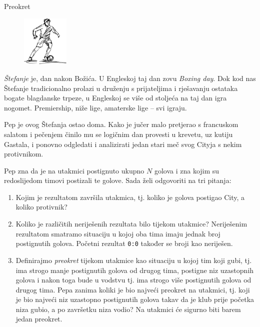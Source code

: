 \begin{statement}[
  problempoints=50,
  timelimit=1 sekunda,
  memorylimit=512 MiB,
]{Preokret}

\setlength\intextsep{-0.1cm}
\begin{figure}
\centering
\includegraphics[width=0.2\textwidth]{img/fudbaler.jpg}
\end{figure}

  \textit{Štefanje} je, dan nakon Božića. U Engleskoj taj dan zovu \textit{Boxing day}. Dok kod nas
Štefanje tradicionalno prolazi u druženju s prijateljima i rješavanju
ostataka bogate blagdanske trpeze, u Engleskoj se više od stoljeća na taj dan
igra nogomet. Premiership, niže lige, amaterske lige -- svi igraju.

Pep je ovog Štefanja ostao doma. Kako je jučer malo pretjerao s francuskom
salatom i pečenjem činilo mu se logičnim dan provesti u krevetu, uz kutiju
Gastala, i ponovno odgledati i analizirati jedan stari meč svog Cityja s
nekim protivnikom.

Pep zna da je na utakmici postignuto ukupno $N$ golova i zna kojim su
redoslijedom timovi postizali te golove. Sada želi odgovoriti na tri pitanja:

\begin{enumerate}
  \item Kojim je rezultatom završila utakmica, tj. koliko je golova postigao
        City, a koliko protivnik?
  \item Koliko je različitih neriješenih rezultata bilo tijekom utakmice?
        Neriješenim rezultatom smatramo situaciju u kojoj oba tima imaju jednak
        broj postignutih golova. Početni rezultat \texttt{0:0} također se broji
        kao neriješen.
  \item Definirajmo \textit{preokret} tijekom utakmice kao situaciju u kojoj
        tim koji gubi, tj. ima strogo manje postignutih golova od drugog tima,
        postigne niz uzastopnih golova i nakon toga bude u vodstvu tj. ima strogo
        više postignutih golova od drugog tima. Pepa zanima koliki je bio najveći
        preokret na utakmici, tj. koji je bio najveći niz uzastopno postignutih
        golova takav da je klub prije početka niza gubio, a po završetku niza
        vodio? Na utakmici će sigurno biti barem jedan preokret.
\end{enumerate}



\end{statement}
